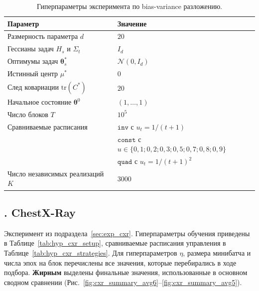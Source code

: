 \documentclass[a4paper,14pt,oneside,openany]{extarticle}
\newcommand{\cN}{\mathcal{N}}
\newcommand{\btheta}{\boldsymbol{\theta}}
\begin{document}
\begin{table}[h!]
\centering
\small
\caption{Гиперпараметры эксперимента по bias-variance разложению.}
\label{tab:hyp_bv}
\begin{tabularx}{\linewidth}{lX}
\toprule
Параметр & Значение \\
\midrule
Размерность параметра $d$ & $20$ \\
Гессианы задач $H_s$ и $\Sigma_t$ & $I_d$ \\
Оптимумы задач $\btheta^*_s$ & $\cN(0, I_d)$ \\
Истинный центр $\mu^*$ & $0$ \\
След ковариации $\mathrm{tr}(C^*)$ & $20$ \\
Начальное состояние $\btheta^0$ & $(1, \ldots, 1)$ \\
Число блоков $T$ & $10^5$ \\
Сравниваемые расписания & $\texttt{inv}$ с $u_t = 1/(t+1)$ \\
& $\texttt{const}$ с $u \in \{0{,}1; 0{,}2; 0{,}3; 0{,}5; 0{,}7; 0{,}8; 0{,}9\}$ \\
& $\texttt{quad}$ с $u_t = 1/(t+1)^2$ \\
Число независимых реализаций $K$ & $3000$ \\
\bottomrule
\end{tabularx}
\end{table}

\newpage
{}
\subsection*{\theappthm. ChestX-Ray}\label{app:hyp_cxr}

Эксперимент из подраздела~\ref{sec:exp_cxr}. Гиперпараметры обучения приведены в Таблице~\ref{tab:hyp_cxr_setup}, сравниваемые расписания управления в Таблице~\ref{tab:hyp_cxr_strategies}. Для гиперпараметров $\eta$, размера минибатча и числа эпох на блок перечислены все значения, которые перебирались в ходе подбора. \textbf{Жирным} выделены финальные значения, использованные в основном сводном сравнении (Рис.~\ref{fig:cxr_summary_avg6}--\ref{fig:cxr_summary_avg5}).
\end{document}
